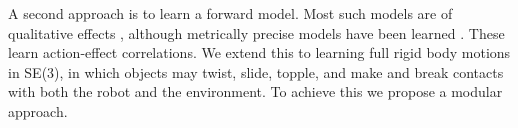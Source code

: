 A second approach is to learn a forward model. Most such models are of qualitative effects \citep{montesano08,moldovan12,hermans11,fitzpatrick_learning_2003,ridge2010self,kroemer2014}, although metrically precise models have been learned \citep{mericli2014, scholz2010combining}. These learn action-effect correlations. We extend this to learning full rigid body motions in SE(3), in which objects may twist, slide, topple, and make and break contacts with both the robot and the environment. To achieve this we propose a modular approach. 
